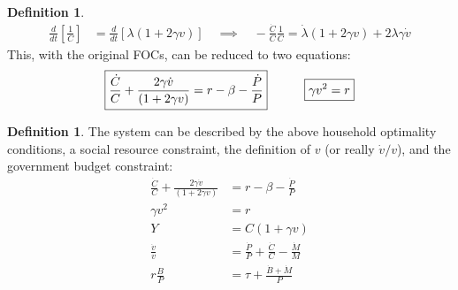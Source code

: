 \documentclass[12pt]{article}
\theoremstyle{plain}
\theoremstyle{definition}
\newtheorem{defn}[thm]{Definition}
\theoremstyle{remark}
\begin{document}
\begin{defn}
\begin{align*}
  \frac{d}{dt}
  \left[
  \frac{1}{C}
  \right]
  &=
  \frac{d}{dt}
  \left[
    \lambda
    \left(
    1+2\gamma v
    \right)
  \right]
  \quad\implies\quad
  -\frac{\dot{C}}{C}
  \frac{1}{C}
  =
    \dot{\lambda}
    \left(
    1+2\gamma v
    \right)
    +
    2\lambda
    \gamma \dot{v}
\end{align*}
This, with the original FOCs, can be reduced to two equations:
\begin{align*}
  \boxed{%
    \frac{\dot{C}}{C}
    + \frac{2 \gamma \dot{v}}{\left( 1+2\gamma v \right)}
    =
    r-\beta -\frac{\dot{P}}{P}
  }
  \quad\qquad
  \boxed{%
    \gamma v^2
    =
    r
  }
\end{align*}
\end{defn}

\begin{defn}
The system can be described by the above household optimality
conditions, a social resource constraint, the definition of $v$ (or
really $\dot{v}/v$), and the government budget constraint:
\begin{align*}
  \frac{\dot{C}}{C}
  + \frac{2 \gamma \dot{v}}{\left( 1+2\gamma v \right)}
  &=
  r-\beta -\frac{\dot{P}}{P}
  \\
  \gamma v^2
  &=
  r
  \\
  Y &= C (1+\gamma v)
  \\
  \frac{\dot{v}}{v}
  &=
  \frac{\dot{P}}{P}
  + \frac{\dot{C}}{C}
  - \frac{\dot{M}}{M}
  \\
  r\frac{B}{P}
  &=
  \tau
  +
  \frac{\dot{B}+\dot{M}}{P}
\end{align*}
\end{defn}
\end{document}
